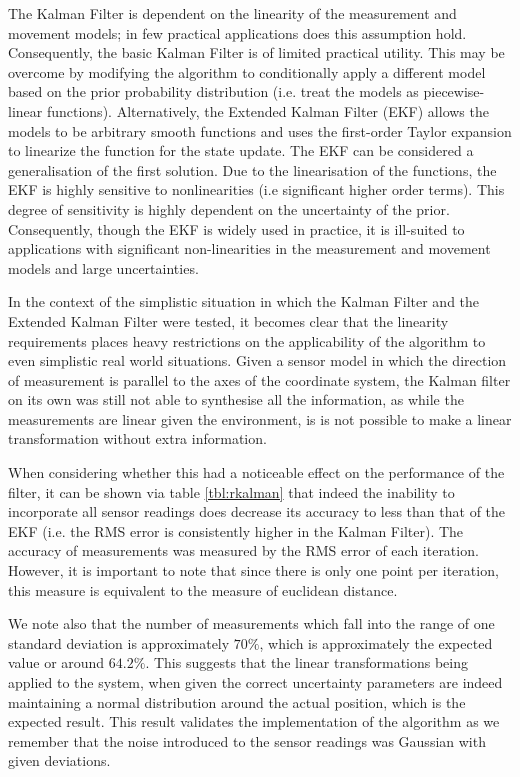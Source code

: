 \documentclass[english]{article}
\begin{document}
The Kalman Filter is dependent on the linearity of the measurement and movement models; in few practical applications does this assumption hold. Consequently, the basic Kalman Filter is of limited practical utility. This may be overcome by  modifying the algorithm to conditionally apply a different model based on the prior probability distribution (i.e. treat the models as piecewise-linear functions). Alternatively, the Extended Kalman Filter (EKF) allows the models to be arbitrary smooth functions and uses the first-order Taylor expansion to linearize the function for the state update. The EKF can be considered a generalisation of the first solution. Due to the linearisation of the functions, the EKF is highly sensitive to nonlinearities (i.e significant higher order terms). This degree of sensitivity is highly dependent on the uncertainty of the prior\cite{probrob}. Consequently, though the EKF is widely used in practice\cite{probrob}, it is ill-suited to applications with significant non-linearities in the measurement and movement models and large uncertainties.

In the context of the simplistic situation in which the Kalman Filter and the Extended Kalman Filter were tested, it becomes clear that the linearity requirements places heavy restrictions on the applicability of the algorithm to even simplistic real world situations. Given a sensor model in which the direction of measurement is parallel to the axes of the coordinate system, the Kalman filter on its own was still not able to synthesise all the information, as while the measurements are linear given the environment, is is not possible to make a linear transformation without extra information.

When considering whether this had a noticeable effect on the performance of the filter, it can be shown via table \ref{tbl:rkalman} that indeed the inability to incorporate all sensor readings does decrease its accuracy to less than that of the EKF (i.e. the RMS error is consistently higher in the Kalman Filter). The accuracy of measurements was measured by the RMS error of each iteration. However, it is important to note that since there is only one point per iteration, this measure is equivalent to the measure of euclidean distance.

We note also that the number of measurements which fall into the range of one standard deviation is approximately $70\%$, which is approximately the expected value or around $64.2\%$. This suggests that the linear transformations being applied to the system, when given the correct uncertainty parameters are indeed maintaining a normal distribution around the actual position, which is the expected result. This result validates the implementation of the algorithm as we remember that the noise introduced to the sensor readings was Gaussian with given deviations.
\end{document}

